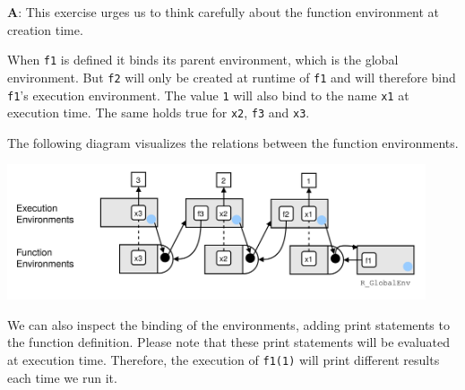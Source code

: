 \documentclass[
]{krantz}
\begin{document}
\textbf{{A}}: This exercise urges us to think carefully about the function environment at creation time.

When \texttt{f1} is defined it binds its parent environment, which is the global environment. But \texttt{f2} will only be created at runtime of \texttt{f1} and will therefore bind \texttt{f1}'s execution environment. The value \texttt{1} will also bind to the name \texttt{x1} at execution time. The same holds true for \texttt{x2}, \texttt{f3} and \texttt{x3}.

The following diagram visualizes the relations between the function environments.

\begin{center}\includegraphics[width=350pt]{images/environments/function_environments_corrected} \end{center}

We can also inspect the binding of the environments, adding print statements to the function definition. Please note that these print statements will be evaluated at execution time. Therefore, the execution of \texttt{f1(1)} will print different results each time we run it.
\end{document}
